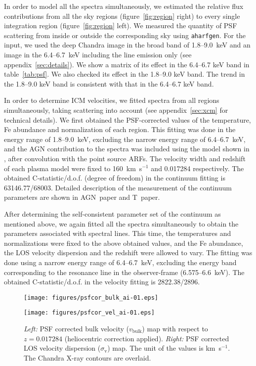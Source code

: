 In order to model all the spectra simultaneously, we estimated the relative flux contributions from all the sky regions (figure~\ref{fig:region} right) to every single integration region (figure~\ref{fig:region} left). We measured the quantity of PSF scattering from inside or outside the corresponding sky using \verb+aharfgen+. For the input, we used the deep Chandra image in the broad band of 1.8--9.0~keV and an image in the 6.4--6.7~keV including the line emission only (see appendix~\ref{sec:details}). We show a matrix of its effect in the 6.4--6.7 keV band in table~\ref{tab:psf}. We also checked its effect in the 1.8--9.0 keV band. The trend in the 1.8--9.0 keV band is consistent with that in the 6.4--6.7 keV band.

In order to determine ICM velocities, we fitted spectra from all regions simultaneously, taking scattering into account (see appendix~\ref{sec:xcm} for technical details). We first obtained the PSF-corrected values of the temperature, Fe abundance and normalization of each region. This fitting was done in the energy range of 1.8--9.0~keV, excluding the narrow energy range of 6.4--6.7~keV, and the AGN contribution to the spectra was included using the model shown in \citet[][hereafter AGN~paper]{agnpaper}, after convolution with the point source ARFs. The velocity width and redshift of each plasma model were fixed to 160~km~s$^{-1}$ and 0.017284 respectively. The obtained C-statistic/d.o.f. (degree of freedom) in the continuum fitting is 63146.77/68003. Detailed description of the measurement of the continuum parameters are shown in AGN~paper and T~paper.

After determining the self-consistent parameter set of the continuum as mentioned above, we again fitted all the spectra simultaneously to obtain the parameters associated with spectral lines. This time, the temperatures and normalizations were fixed to the above obtained values, and the Fe abundance, the LOS velocity dispersion and the redshift were allowed to vary. The fitting was done using a narrow energy range of 6.4--6.7~keV, excluding the energy band corresponding to the resonance line in the observer-frame (6.575--6.6~keV). The obtained C-statistic/d.o.f. in the velocity fitting is 2822.38/2896.

\begin{figure*}
 \begin{minipage}{0.495\hsize}
  \centering
  \texttt{[image: figures/psfcor\_bulk\_ai-01.eps]}
 \end{minipage}
 \begin{minipage}{0.495\hsize}
  \centering
  \texttt{[image: figures/psfcor\_vel\_ai-01.eps]}
 \end{minipage}
 \caption{{\it Left:} PSF corrected bulk velocity ($v_\mathrm{bulk}$) map with respect to $z=0.017284$ (heliocentric correction applied). {\it Right:} PSF corrected LOS velocity dispersion ($\sigma_\mathrm{v}$) map. The unit of the values is km~s$^{-1}$. The Chandra X-ray contours are overlaid.}\label{fig:velocity_psfcor}
\end{figure*}

